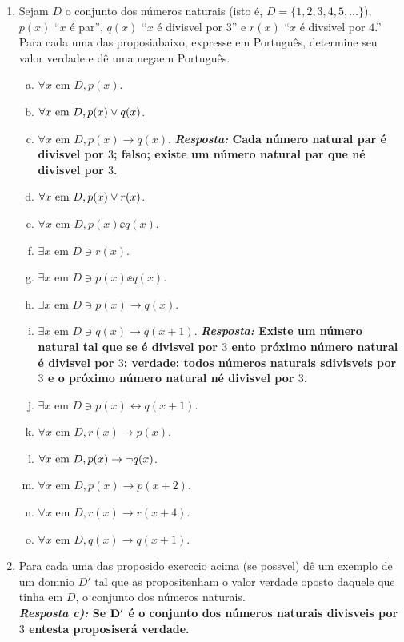 \begin{enumerate}[{\bf 1.}]
\item Sejam $D$ o conjunto dos n\'umeros naturais (isto \'e, $D=\{1,2,3,4,5,\ldots\}$), $p(x)$ ``$x$ \'e par'', $q(x)$ ``$x$ \'e divis\ih vel por $3$'' e $r(x)$ ``$x$ \'e div\ih sivel por $4$.'' Para cada uma das proposi\coes abaixo, expresse em Portugu\^es, determine seu valor verdade e d\^e uma nega\cao em Portugu\^es.  
\begin{enumerate}[a)]
\item $\forall x \textrm{ em } D, p(x)$.
\item $\forall x \textrm{ em } D, p(x)\vee q(x)$.
\item $\forall x \textrm{ em } D, p(x)\to q(x)$. {\bf{\it Resposta:} Cada n\'umero natural par \'e divis\ih vel por $3$; falso; existe um n\'umero natural par que n\ao \'e divis\ih vel por $3$.}
\item $\forall x \textrm{ em } D, p(x)\vee r(x)$.
\item $\forall x \textrm{ em } D, p(x)\ee q(x)$.
\item $\exists x \textrm{ em } D \ni r(x)$.
\item $\exists x \textrm{ em } D \ni p(x)\ee q(x)$.
\item $\exists x \textrm{ em } D \ni p(x)\to q(x)$.
\item $\exists x \textrm{ em } D \ni q(x)\to q(x+1)$. {\bf{\it Resposta:} Existe um n\'umero natural tal que se \'e divis\ih vel por $3$ ent\ao o pr\'oximo n\'umero natural \'e divis\ih vel por $3$; verdade; todos n\'umeros naturais s\ao divis\ih veis por $3$ e o pr\'oximo n\'umero natural n\ao \'e divis\ih vel por $3$.}
\item $\exists x \textrm{ em } D \ni p(x) \leftrightarrow q(x+1)$.
\item $\forall x \textrm{ em } D, r(x)\to p(x)$.
\item $\forall x \textrm{ em } D, p(x)\to\lnot q(x)$.
\item $\forall x \textrm{ em } D, p(x)\to p(x+2)$.
\item $\forall x \textrm{ em } D, r(x)\to r(x+4)$.
\item $\forall x \textrm{ em } D, q(x)\to q(x+1)$.
\end{enumerate}

\item Para cada uma das proposi\coes do exerc\ih cio acima (se poss\ih vel) d\^e um exemplo de um dom\ih nio $D'$ tal que as proposi\coes tenham o valor verdade oposto daquele que tinha em $D$, o conjunto dos n\'umeros naturais.\\
{\bf{\it Resposta c):} Se ${\bf D'}$ \'e o conjunto dos n\'umeros naturais divis\ih veis por $3$ ent\ao esta proposi\cao ser\'a verdade.}\\


\end{enumerate}
